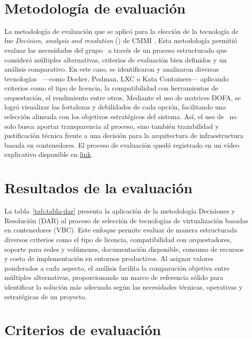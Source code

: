 \label{cap:dar}
\mbox{}\\
\section{Metodología de evaluación}
\noindent
La metodología de evaluación que se aplicó para la elección de la tecnología de \VBC fue \textit{Decision, analysis and resolution} (\DAR) de CMMI \citep{CMMIInstitute2010}. Esta metodología permitió evaluar las necesidades del grupo \GRID\ a través de un proceso estructurado que consideró múltiples alternativas, criterios de evaluación bien definidos y un análisis comparativo. En este caso, se identificaron y analizaron diversas tecnologías \VBC\ —como Docker, Podman, LXC o Kata Containers— aplicando criterios como el tipo de licencia, la compatibilidad con herramientas de orquestación, el rendimiento entre otros. Mediante el uso de matrices DOFA, se logró visualizar las fortalezas y debilidades de cada opción, facilitando una selección alineada con los objetivos estratégicos del sistema. Así, el uso de \DAR\ no solo busca aportar transparencia al proceso, sino también trazabilidad y justificación técnica frente a una decisión para la arquitectura de infraestructura basada en contenedores.
El proceso de evaluación quedó registrado en un vídeo explicativo disponible en \href{https://youtu.be/xOmuQs2RX2c}{link}.

\section{Resultados de la evaluación}
\noindent
La tabla~\ref{tab:tabla-dar} presenta la aplicación de la metodología Decisiones y Resolución (DAR) al proceso de selección de tecnologías de virtualización basadas en contenedores (VBC). Este enfoque permite evaluar de manera estructurada diversos criterios como el tipo de licencia, compatibilidad con orquestadores, soporte para redes y volúmenes, documentación disponible, consumo de recursos y costo de implementación en entornos productivos. Al asignar valores ponderados a cada aspecto, el análisis facilita la comparación objetiva entre múltiples alternativas, proporcionando un marco de referencia sólido para identificar la solución más adecuada según las necesidades técnicas, operativas y estratégicas de un proyecto.


\section{Criterios de evaluación}

